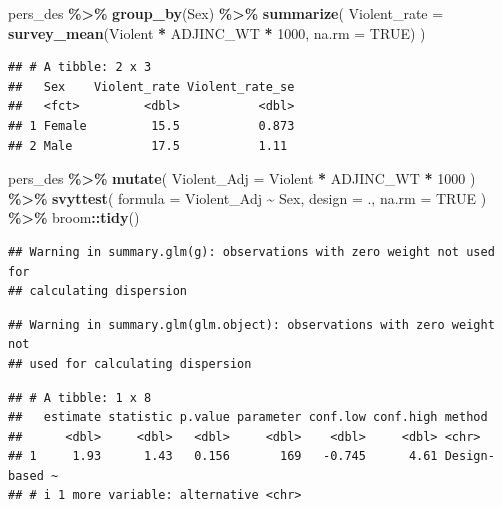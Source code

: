 \documentclass[
]{krantz}
\makeatletter
\newenvironment{Shaded}{\begin{snugshade}}{\end{snugshade}}
\newcommand{\AttributeTok}[1]{\textcolor[rgb]{0.27,0.27,0.27}{#1}}
\newcommand{\ConstantTok}[1]{\textcolor[rgb]{0.37,0.37,0.37}{#1}}
\newcommand{\DecValTok}[1]{\textcolor[rgb]{0.06,0.06,0.06}{#1}}
\newcommand{\FunctionTok}[1]{\textcolor[rgb]{0.27,0.27,0.27}{\textbf{#1}}}
\newcommand{\NormalTok}[1]{#1}
\newcommand{\SpecialCharTok}[1]{\textcolor[rgb]{0.43,0.43,0.43}{\textbf{#1}}}
\newenvironment{kframe}{%
\medskip{}
\setlength{\fboxsep}{.8em}
 \def\at@end@of@kframe{}%
 \ifinner\ifhmode%
  \def\at@end@of@kframe{\end{minipage}}%
  \begin{minipage}{\columnwidth}%
 \fi\fi%
 \def\FrameCommand##1{\hskip\@totalleftmargin \hskip-\fboxsep
 \colorbox{shadecolor}{##1}\hskip-\fboxsep
     \hskip-\linewidth \hskip-\@totalleftmargin \hskip\columnwidth}%
 \MakeFramed {\advance\hsize-\width
   \@totalleftmargin\z@ \linewidth\hsize
   \@setminipage}}%
 {\par\unskip\endMakeFramed%
 \at@end@of@kframe}
\renewenvironment{Shaded}{\begin{kframe}}{\end{kframe}}
\makeatother
\begin{document}
\begin{Shaded}
\begin{Highlighting}[]
\NormalTok{pers\_des }\SpecialCharTok{\%\textgreater{}\%}
  \FunctionTok{group\_by}\NormalTok{(Sex) }\SpecialCharTok{\%\textgreater{}\%}
  \FunctionTok{summarize}\NormalTok{(}
    \AttributeTok{Violent\_rate =} \FunctionTok{survey\_mean}\NormalTok{(Violent }\SpecialCharTok{*}\NormalTok{ ADJINC\_WT }\SpecialCharTok{*} \DecValTok{1000}\NormalTok{, }\AttributeTok{na.rm =} \ConstantTok{TRUE}\NormalTok{)}
\NormalTok{  )}
\end{Highlighting}
\end{Shaded}

\begin{verbatim}
## # A tibble: 2 x 3
##   Sex    Violent_rate Violent_rate_se
##   <fct>         <dbl>           <dbl>
## 1 Female         15.5           0.873
## 2 Male           17.5           1.11
\end{verbatim}

\begin{Shaded}
\begin{Highlighting}[]
\NormalTok{pers\_des }\SpecialCharTok{\%\textgreater{}\%}
  \FunctionTok{mutate}\NormalTok{(}
    \AttributeTok{Violent\_Adj =}\NormalTok{ Violent }\SpecialCharTok{*}\NormalTok{ ADJINC\_WT }\SpecialCharTok{*} \DecValTok{1000}
\NormalTok{  ) }\SpecialCharTok{\%\textgreater{}\%}
  \FunctionTok{svyttest}\NormalTok{(}
    \AttributeTok{formula =}\NormalTok{ Violent\_Adj }\SpecialCharTok{\textasciitilde{}}\NormalTok{ Sex,}
    \AttributeTok{design =}\NormalTok{ .,}
    \AttributeTok{na.rm =} \ConstantTok{TRUE}
\NormalTok{  ) }\SpecialCharTok{\%\textgreater{}\%}
\NormalTok{  broom}\SpecialCharTok{::}\FunctionTok{tidy}\NormalTok{()}
\end{Highlighting}
\end{Shaded}

\begin{verbatim}
## Warning in summary.glm(g): observations with zero weight not used for
## calculating dispersion
\end{verbatim}

\begin{verbatim}
## Warning in summary.glm(glm.object): observations with zero weight not
## used for calculating dispersion
\end{verbatim}

\begin{verbatim}
## # A tibble: 1 x 8
##   estimate statistic p.value parameter conf.low conf.high method        
##      <dbl>     <dbl>   <dbl>     <dbl>    <dbl>     <dbl> <chr>         
## 1     1.93      1.43   0.156       169   -0.745      4.61 Design-based ~
## # i 1 more variable: alternative <chr>
\end{verbatim}
\end{document}
